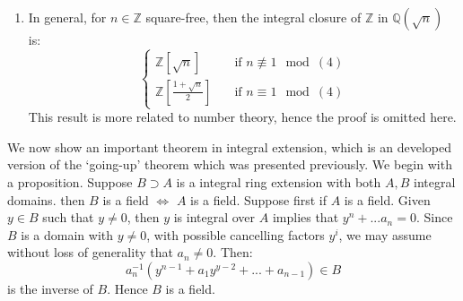 \documentclass[12pt]{article}
\theoremstyle{definition}
\theoremstyle{plain}
\newcommand{\rat}{\mathbb{Q}}
\newcommand{\z}{\mathbb{Z}}
\newcommand{\overbar}[1]{\mkern 1.5mu\overline{\mkern-1.5mu#1\mkern-1.5mu}\mkern 1.5mu}
\renewcommand{\bar}{\overbar}
\begin{document}
\begin{enumerate}
\begin{proof}
       \medskip
       If $x=\bar{x}$, it is easy, for $x\in \rat$. On the other hand, if $x\neq \bar{x}$, then $x+\bar{x}=2a$ and $x\bar{x}=a^2-5b^2$. then $x$ and $\bar{x}$ are distinct roots of $f$, with their sum and product integral over $\z$. But $\z$ as an UFD is integrally closed in its fraction field $\rat$, hence we have $x+bar{x}$ and $x\bar{x}$ all lies in $\z$, that is, $f\in \z[x]$. Hence $2a\in \z$, Also $(2a)^2-5(2b)^2=4(a^2-5b^2)$ is an integer, which implies $5\cdot (2b)^2$, is a integer. This forces $2b$ to be a integer, as $5$ is not a square number. Summing up, we see $x\in \frac{\z+\z\sqrt{5}}{2}$
       \end{proof}
  \item In general, for $n\in \z$ square-free, then the integral closure of $\z$ in $\rat(\sqrt{n})$ is:
      \begin{equation}
        \begin{cases}
          \z[\sqrt{n}{}] \quad&\text{if } n\not\equiv 1 \mod(4)\\
          \z[\frac{1+\sqrt{n}}{2}]\quad &\text{if } n\equiv 1 \mod(4)
        \end{cases}
      \end{equation}
    This result is more related to number theory, hence the proof is omitted here.
\end{enumerate}
We now show an important theorem in integral extension, which is an developed version of the `going-up' theorem which was presented previously. We begin with a proposition.
\Prop Suppose $B\supset A$ is a integral ring extension with both $A, B$ integral domains. then $B$ is a field $\iff$ $A$ is a field.
\proof Suppose first if $A$ is a field. Given $y\in B$ such that $y\neq 0$, then $y$ is integral over $A$ implies that $y^n+...a_n=0$. Since $B$ is a domain with $y\neq 0$, with possible cancelling factors $y^i$, we may assume without loss of generality that $a_n\neq 0$. Then:
\[a_n^{-1}(y^{n-1}+a_1y^{y-2}+...+a_{n-1})\in B\]
is the inverse of $B$. Hence $B$ is a field.
\end{document}
